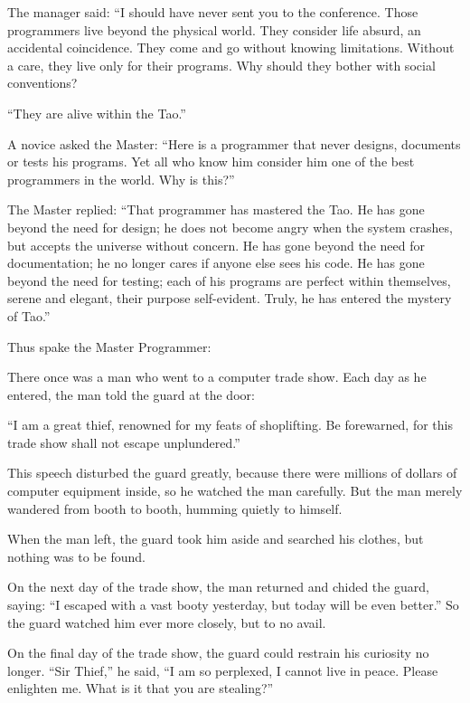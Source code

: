 The manager said: ``I should have never sent you to the conference. Those programmers live beyond the physical world. They consider life absurd, an accidental coincidence. They come and go without knowing limitations. Without a care, they live only for their programs. Why should they bother with social conventions?

``They are alive within the Tao.''

A novice asked the Master: ``Here is a programmer that never designs, documents or tests his programs. Yet all who know him consider him one of the best programmers in the world. Why is this?''

The Master replied: ``That programmer has mastered the Tao. He has gone beyond the need for design; he does not become angry when the system crashes, but accepts the universe without concern. He has gone beyond the need for documentation; he no longer cares if anyone else sees his code. He has gone beyond the need for testing; each of his programs are perfect within themselves, serene and elegant, their purpose self-evident. Truly, he has entered the mystery of Tao.''

Thus spake the Master Programmer:

There once was a man who went to a computer trade show. Each day as he entered, the man told the guard at the door:

``I am a great thief, renowned for my feats of shoplifting. Be forewarned, for this trade show shall not escape unplundered.''

This speech disturbed the guard greatly, because there were millions of dollars of computer equipment inside, so he watched the man carefully. But the man merely wandered from booth to booth, humming quietly to himself.

When the man left, the guard took him aside and searched his clothes, but nothing was to be found.

On the next day of the trade show, the man returned and chided the guard, saying: ``I escaped with a vast booty yesterday, but today will be even better.'' So the guard watched him ever more closely, but to no avail.

On the final day of the trade show, the guard could restrain his curiosity no longer. ``Sir Thief,'' he said, ``I am so perplexed, I cannot live in peace. Please enlighten me. What is it that you are stealing?''

